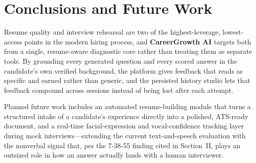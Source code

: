 \documentclass[conference]{IEEEtran}
\begin{document}
\section{Conclusions and Future Work}
Resume quality and interview rehearsal are two of the highest-leverage, lowest-access points in the modern hiring process, and \textbf{CareerGrowth AI} targets both from a single, resume-aware diagnostic core rather than treating them as separate tools. By grounding every generated question and every scored answer in the candidate's own verified background, the platform gives feedback that reads as specific and earned rather than generic, and the persisted history studio lets that feedback compound across sessions instead of being lost after each attempt.

Planned future work includes an automated resume-building module that turns a structured intake of a candidate's experience directly into a polished, ATS-ready document, and a real-time facial-expression and vocal-confidence tracking layer during mock interviews---extending the current text-and-speech evaluation with the nonverbal signal that, per the 7-38-55 finding cited in Section~II, plays an outsized role in how an answer actually lands with a human interviewer.
\end{document}
